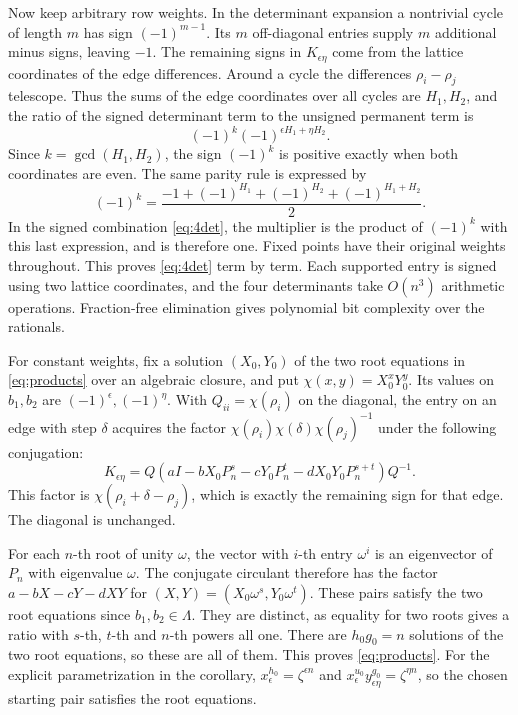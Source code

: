 \documentclass[11pt,reqno]{amsart}
\theoremstyle{remark}
\numberwithin{equation}{section}
\begin{document}
Now keep arbitrary row weights. In the determinant expansion a nontrivial
cycle of length \(m\) has sign \((-1)^{m-1}\). Its \(m\) off-diagonal
entries supply \(m\) additional minus signs, leaving \(-1\). The
remaining signs in \(K_{\epsilon\eta}\) come from the lattice coordinates
of the edge differences. Around a cycle the differences \(\rho_i-\rho_j\)
telescope. Thus the sums of the edge coordinates over all cycles are
\(H_1,H_2\), and the ratio of the signed determinant term to the unsigned
permanent term is
\[
 (-1)^k(-1)^{\epsilon H_1+\eta H_2}.
\]
Since \(k=\gcd(H_1,H_2)\), the sign \((-1)^k\) is positive exactly when
both coordinates are even. The same parity rule is expressed by
\[
 (-1)^k
   =\frac{-1+(-1)^{H_1}+(-1)^{H_2}+(-1)^{H_1+H_2}}{2}.
\]
In the signed combination \eqref{eq:4det}, the multiplier is the product
of \((-1)^k\) with this last expression, and is therefore one. Fixed
points have their original weights throughout. This proves
\eqref{eq:4det} term by term. Each supported entry is signed using two
lattice coordinates, and the four determinants take \(O(n^3)\) arithmetic
operations. Fraction-free elimination gives polynomial bit complexity
over the rationals.

For constant weights, fix a solution \((X_0,Y_0)\) of the two root
equations in \eqref{eq:products} over an algebraic closure, and put
\(\chi(x,y)=X_0^xY_0^y\). Its values on \(b_1,b_2\) are
\((-1)^\epsilon,(-1)^\eta\). With \(Q_{ii}=\chi(\rho_i)\) on the
diagonal, the entry on an edge with step \(\delta\) acquires the factor
\(\chi(\rho_i)\chi(\delta)\chi(\rho_j)^{-1}\) under the following
conjugation:
\[
 K_{\epsilon\eta}=Q
   (aI-bX_0P_n^s-cY_0P_n^t-dX_0Y_0P_n^{s+t})Q^{-1}.
\]
This factor is \(\chi(\rho_i+\delta-\rho_j)\), which is exactly the
remaining sign for that edge. The diagonal is unchanged.

For each \(n\)-th root of unity \(\omega\), the vector with \(i\)-th
entry \(\omega^i\) is an eigenvector of \(P_n\) with eigenvalue
\(\omega\). The conjugate circulant therefore has the factor
\(a-bX-cY-dXY\) for \((X,Y)=(X_0\omega^s,Y_0\omega^t)\). These pairs
satisfy the two root equations since \(b_1,b_2\in\Lambda\). They are
distinct, as equality for two roots gives a ratio with \(s\)-th, \(t\)-th
and \(n\)-th powers all one. There are \(h_0g_0=n\) solutions of the two
root equations, so these are all of them. This proves
\eqref{eq:products}. For the explicit parametrization in the corollary,
\(x_\epsilon^{h_0}=\zeta^{\epsilon n}\) and
\(x_\epsilon^{u_0}y_{\epsilon\eta}^{g_0} =\zeta^{\eta n}\), so the chosen
starting pair satisfies the root equations.
\end{document}
